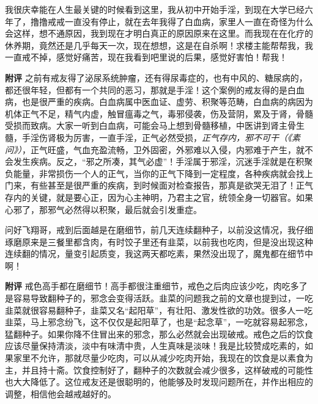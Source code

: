 \begin{case}
    我很庆幸能在人生最关键的时候看到这里，我从初中开始手淫，到现在大学已经六年了，撸撸戒戒一直没有停止，就在去年我得了白血病，家里人一直在奇怪为什么会这样，想不通原因，我到现在才明白真正的原因原来在这里。而我现在在化疗的休养期，竟然还是几乎每天一次，现在想想，这是在自杀啊！求楼主能帮帮我，我一直戒不掉，感觉好痛苦，现在我看到吧里说的后果，感觉好害怕！帮我！

    \textbf{附评} 之前有戒友得了泌尿系统肿瘤，还有得尿毒症的，也有中风的、糖尿病的，都还很年轻，但都有一个共同的恶习，那就是手淫！这个案例的戒友得的是白血病，也是很严重的疾病。白血病属中医血证、虚劳、积聚等范畴，白血病的病因为机体正气不足，精气内虚，触冒瘟毒之气，毒邪侵袭，伤及营阴，累及于肾，骨髓受损而致病。大家一听到白血病，可能会马上想到骨髓移植，中医讲到肾主骨生髓，手淫伤肾极为厉害，一直手淫，正气必然受损，\textit{正气存内，邪不可干（《素问》）}，正气旺盛，气血充盈流畅，卫外固密，外邪难以入侵，内邪难于产生，就不会发生疾病。反之，“邪之所凑，其气必虚”！手淫属于邪淫，沉迷手淫就是在积聚负能量，非常损伤一个人的正气，当你的正气下降到一定程度，各种疾病就会找上门来，有些甚至是很严重的疾病，到时候面对检查报告，那真是欲哭无泪了！正气存内的关键，就是要心正，因为心主神明，乃君主之官，统领全身一切器官。如果心邪了，那邪气必然得以积聚，最后就会引发重症。
\end{case}

\begin{case}
    问好飞翔哥，戒到后面越是在磨细节，前几天连续翻种子，以前没这情况，我仔细琢磨原来是三餐里都含肉，有时饺子里还有韭菜，以前我也吃肉，但是没出现这种连续翻的情况，量变引起质变，我这两天都吃素，果然没出现了，魔鬼都在细节中啊！

    \textbf{附评} 戒色高手都在磨细节！高手都很注重细节，戒色之后肉应该少吃，肉吃多了是容易导致翻种子的，邪念会变得活跃。韭菜的问题我之前的文章也提到过，一吃韭菜就很容易翻种子，韭菜又名“起阳草”，有壮阳、激发性欲的功效。很多人一吃韭菜，马上邪念纷飞，这不仅仅是起阳草了，也是“起念草”，一吃就容易起邪念，猛翻种子。如果你降不住冒出来的邪念，那么必然就会出现破戒。戒色之后的饮食应该尽量保持清淡，淡中有味清中贵，人生真味是淡味！我是比较赞成吃素的，如果家里不允许，那就尽量少吃肉，可以从减少吃肉开始，我现在的饮食是以素食为主，并且持十斋。饮食控制好了，翻种子的次数就会减少很多，这样破戒的可能性也大大降低了。这位戒友还是很聪明的，他能够及时发现问题所在，并作出相应的调整，相信他会越戒越好的。
\end{case}

